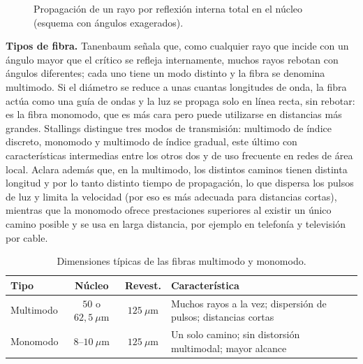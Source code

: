 \documentclass[11pt,a4paper]{article}
\begin{document}
\begin{enumerate}[label=4.\arabic*), itemsep=0.3cm]
\begin{figure}[h]
          \caption{Propagación de un rayo por reflexión interna total en el núcleo (esquema con ángulos exagerados).}
        \end{figure}

        \textbf{Tipos de fibra.} Tanenbaum señala que, como cualquier rayo que incide con un ángulo mayor que el crítico se refleja internamente, muchos rayos rebotan con ángulos diferentes; cada uno tiene un modo distinto y la fibra se denomina multimodo. Si el diámetro se reduce a unas cuantas longitudes de onda, la fibra actúa como una guía de ondas y la luz se propaga solo en línea recta, sin rebotar: es la fibra monomodo, que es más cara pero puede utilizarse en distancias más grandes. Stallings distingue tres modos de transmisión: multimodo de índice discreto, monomodo y multimodo de índice gradual, este último con características intermedias entre los otros dos y de uso frecuente en redes de área local. Aclara además que, en la multimodo, los distintos caminos tienen distinta longitud y por lo tanto distinto tiempo de propagación, lo que dispersa los pulsos de luz y limita la velocidad (por eso es más adecuada para distancias cortas), mientras que la monomodo ofrece prestaciones superiores al existir un único camino posible y se usa en larga distancia, por ejemplo en telefonía y televisión por cable.

        \begin{table}[h]
          \centering
          \begin{tabular}{lccp{5.2cm}}
            \toprule
            \textbf{Tipo} & \textbf{Núcleo} & \textbf{Revest.} & \textbf{Característica} \\
            \midrule
            Multimodo & $50$ o $62{,}5~\mu$m & $125~\mu$m & Muchos rayos a la vez; dispersión de pulsos; distancias cortas \\
            Monomodo  & $8$--$10~\mu$m       & $125~\mu$m & Un solo camino; sin distorsión multimodal; mayor alcance \\
            \bottomrule
          \end{tabular}
          \caption{Dimensiones típicas de las fibras multimodo y monomodo.}
        \end{table}


\end{enumerate}
\end{document}
